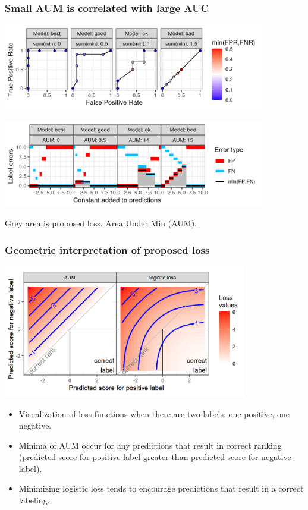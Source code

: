 \documentclass[t]{beamer}
\begin{document}
\begin{frame}
  \frametitle{Small AUM is correlated with large AUC} 
  
  \includegraphics[height=1.5in]{figure-more-than-one-binary-dots}

  \includegraphics[height=1.5in]{figure-more-than-one-binary-aum}

  Grey area is proposed loss, Area Under Min (AUM).
  
\end{frame}

\begin{frame}
  \frametitle{Geometric interpretation of proposed loss}
  
    \centering
    \includegraphics[width=0.8\textwidth]{figure-compare-hinge-loss-contours-logistic.png}

    \begin{itemize}
    \item Visualization of loss functions when there are two labels: one
      positive, one negative.
    \item Minima of AUM occur for any predictions that result in
      correct ranking (predicted score for positive label greater than
      predicted score for negative label).
    \item Minimizing logistic loss tends to encourage predictions that
      result in a correct labeling.
    \end{itemize}
\end{frame}
\end{document}
